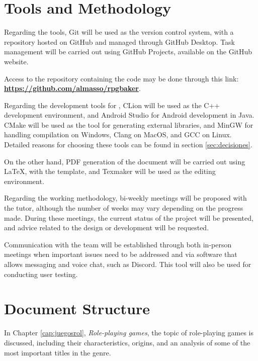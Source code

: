 \section*{Tools and Methodology}
Regarding the tools, Git will be used as the version control system, with a repository hosted on GitHub and managed through GitHub Desktop. Task management will be carried out using GitHub Projects, available on the GitHub website.

\smallskip

Access to the repository containing the code may be done through this link: \href{https://github.com/almasso/rpgbaker}{\textbf{https://github.com/almasso/rpgbaker}}.

\medskip

Regarding the development tools for \baker, CLion will be used as the C++ development environment, and Android Studio for Android development in Java. CMake will be used as the tool for generating external libraries, and MinGW for handling compilation on Windows, Clang on MacOS, and GCC on Linux. Detailed reasons for choosing these tools can be found in section \ref{sec:decisiones}.

\medskip

On the other hand, PDF generation of the document will be carried out using \LaTeX, with the \texis{} template, and Texmaker will be used as the editing environment.

\bigskip

Regarding the working methodology, bi-weekly meetings will be proposed with the tutor, although the number of weeks may vary depending on the progress made. During these meetings, the current status of the project will be presented, and advice related to the design or development will be requested.

\medskip

Communication with the team will be established through both in-person meetings when important issues need to be addressed and via software that allows messaging and voice chat, such as Discord. This tool will also be used for conducting user testing.

\section*{Document Structure} 
In Chapter \ref{cap:juegosrol}, \textit{Role-playing games}, the topic of role-playing games is discussed, including their characteristics, origins, and an analysis of some of the most important titles in the genre.

